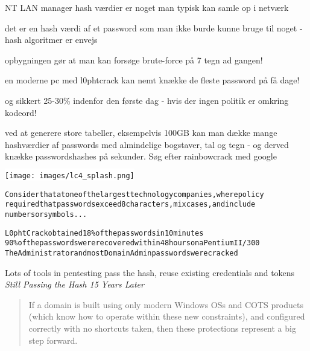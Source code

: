 \documentclass[20pt,landscape,a4paper,footrule]{foils}
\begin{document}
\begin{list1}
  \item NT LAN manager hash værdier er noget man typisk kan samle op i
  netværk
\item det er en hash værdi af et password som man ikke burde kunne
  bruge til noget - hash algoritmer er envejs
\item opbygningen gør at man kan forsøge brute-force på 7 tegn ad
  gangen!
\item en moderne pc med l0phtcrack kan nemt knække de fleste password
  på få dage!
\item og sikkert 25-30\% indenfor den første dag - hvis der ingen
  politik er omkring kodeord!
\item ved at generere store tabeller, eksempelvis 100GB kan man dække
  mange hashværdier af passwords med almindelige bogstaver, tal og
  tegn - og derved knække passwordshashes på sekunder. Søg efter
  rainbowcrack med google
\end{list1}

\begin{center}
\colorbox{white}{\texttt{[image: images/lc4\_splash.png]}}
\end{center}

\begin{alltt}
\small
Consider that at one of the largest technology companies, where policy
required that passwords exceed 8 characters, mix cases, and include
numbers or symbols...

L0phtCrack obtained 18\% of the passwords in 10 minutes
90\% of the passwords were recovered within 48 hours on a Pentium II/300
The Administrator and most Domain Admin passwords were cracked
\end{alltt}


Lots of tools in pentesting pass the hash, reuse existing credentials and tokens
\emph{Still Passing the Hash 15 Years Later}\\

\begin{quote}
If a domain is built using only modern Windows OSs and COTS products (which know how to operate within these new constraints), and configured correctly with no shortcuts taken, then these protections represent a big step forward.
\end{quote}
\end{document}

